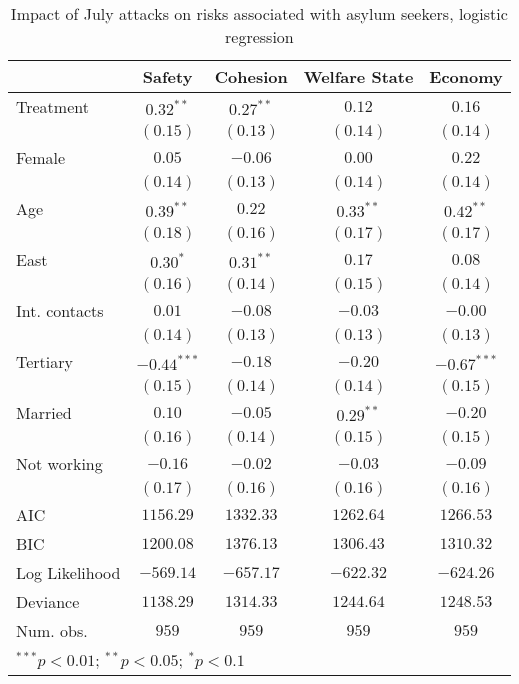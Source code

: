 
\begin{table}
\caption{Impact of July attacks on risks associated with asylum seekers, logistic regression}
\begin{center}
\begin{tabular}{l c c c c}
\toprule
 & Safety & Cohesion & Welfare State & Economy \\
\midrule
Treatment      & $0.32^{**}$   & $0.27^{**}$ & $0.12$      & $0.16$        \\
               & $(0.15)$      & $(0.13)$    & $(0.14)$    & $(0.14)$      \\
Female         & $0.05$        & $-0.06$     & $0.00$      & $0.22$        \\
               & $(0.14)$      & $(0.13)$    & $(0.14)$    & $(0.14)$      \\
Age            & $0.39^{**}$   & $0.22$      & $0.33^{**}$ & $0.42^{**}$   \\
               & $(0.18)$      & $(0.16)$    & $(0.17)$    & $(0.17)$      \\
East           & $0.30^{*}$    & $0.31^{**}$ & $0.17$      & $0.08$        \\
               & $(0.16)$      & $(0.14)$    & $(0.15)$    & $(0.14)$      \\
Int. contacts  & $0.01$        & $-0.08$     & $-0.03$     & $-0.00$       \\
               & $(0.14)$      & $(0.13)$    & $(0.13)$    & $(0.13)$      \\
Tertiary       & $-0.44^{***}$ & $-0.18$     & $-0.20$     & $-0.67^{***}$ \\
               & $(0.15)$      & $(0.14)$    & $(0.14)$    & $(0.15)$      \\
Married        & $0.10$        & $-0.05$     & $0.29^{**}$ & $-0.20$       \\
               & $(0.16)$      & $(0.14)$    & $(0.15)$    & $(0.15)$      \\
Not working    & $-0.16$       & $-0.02$     & $-0.03$     & $-0.09$       \\
               & $(0.17)$      & $(0.16)$    & $(0.16)$    & $(0.16)$      \\
\midrule
AIC            & $1156.29$     & $1332.33$   & $1262.64$   & $1266.53$     \\
BIC            & $1200.08$     & $1376.13$   & $1306.43$   & $1310.32$     \\
Log Likelihood & $-569.14$     & $-657.17$   & $-622.32$   & $-624.26$     \\
Deviance       & $1138.29$     & $1314.33$   & $1244.64$   & $1248.53$     \\
Num. obs.      & $959$         & $959$       & $959$       & $959$         \\
\bottomrule
\multicolumn{5}{l}{\scriptsize{$^{***}p<0.01$; $^{**}p<0.05$; $^{*}p<0.1$}}
\end{tabular}
\label{tab_risk_glm}
\end{center}
\end{table}
